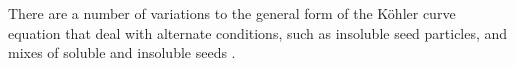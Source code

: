 

			There are a number of variations to the general form of the K\"{o}hler curve equation that deal with alternate conditions, such as insoluble seed particles, and mixes of soluble and insoluble seeds \citep[Chapter 17]{seinfeld2012atmospheric}.
